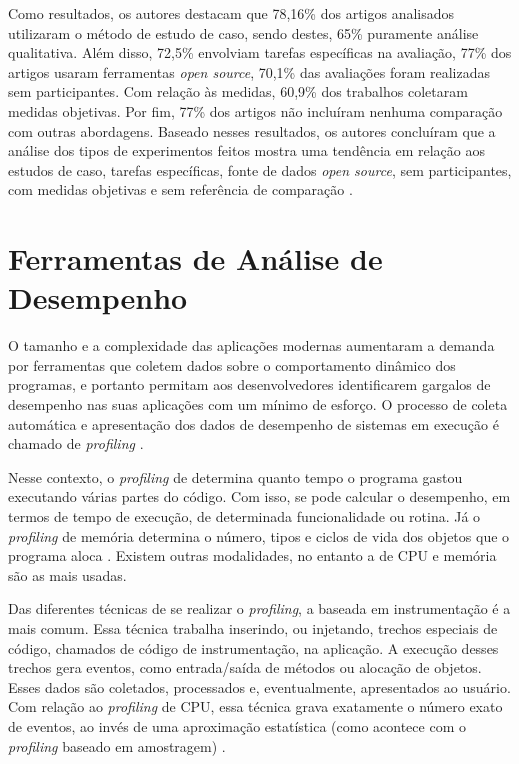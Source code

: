 Como resultados, os autores destacam que 78,16\% dos artigos analisados utilizaram o método de estudo de caso, sendo destes, 65\% puramente análise qualitativa. Além disso, 72,5\% envolviam tarefas específicas na avaliação, 77\% dos artigos usaram ferramentas \textit{open source}, 70,1\% das avaliações foram realizadas sem participantes. Com relação às medidas, 60,9\% dos trabalhos coletaram medidas objetivas. Por fim, 77\% dos artigos não incluíram nenhuma comparação com outras abordagens. Baseado nesses resultados, os autores concluíram que a análise dos tipos de experimentos feitos mostra uma tendência em relação aos estudos de caso, tarefas específicas, fonte de dados \textit{open source}, sem participantes, com medidas objetivas e sem referência de comparação \cite{Seriai2014}.

\section{Ferramentas de Análise de Desempenho} \label{sec:ferramentas-analise-desempenho}

O tamanho e a complexidade das aplicações modernas aumentaram a demanda por ferramentas que coletem dados sobre o comportamento dinâmico dos programas, e portanto permitam aos desenvolvedores identificarem gargalos de desempenho nas suas aplicações com um mínimo de esforço. O processo de coleta automática e apresentação dos dados de desempenho de sistemas em execução é chamado de \textit{profiling} \cite{Dmitriev2004}.

Nesse contexto, o \textit{profiling} de determina quanto tempo o programa gastou executando várias partes do código. Com isso, se pode calcular o desempenho, em termos de tempo de execução, de determinada funcionalidade ou rotina. Já o \textit{profiling} de memória determina o número, tipos e ciclos de vida dos objetos que o programa aloca \cite{Dmitriev2004}. Existem outras modalidades, no entanto a de CPU e memória são as mais usadas.

Das diferentes técnicas de se realizar o \textit{profiling}, a baseada em instrumentação é a mais comum. Essa técnica trabalha inserindo, ou injetando, trechos especiais de código, chamados de código de instrumentação, na aplicação. A execução desses trechos gera eventos, como entrada/saída de métodos ou alocação de objetos. Esses dados são coletados, processados e, eventualmente, apresentados ao usuário. Com relação ao \textit{profiling} de CPU, essa técnica grava exatamente o número exato de eventos, ao invés de uma aproximação estatística (como acontece com o \textit{profiling} baseado em amostragem) \cite{Dmitriev2004}.


